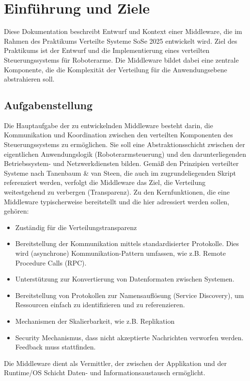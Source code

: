 \chapter{Einführung und Ziele}

Diese Dokumentation beschreibt Entwurf und Kontext einer Middleware, die im Rahmen des Praktikums \glqq Verteilte Systeme SoSe 2025\grqq{} entwickelt wird. Ziel des Praktikums ist der Entwurf und die Implementierung eines verteilten Steuerungssystems für Roboterarme. Die Middleware bildet dabei eine zentrale Komponente, die die Komplexität der Verteilung für die Anwendungsebene abstrahieren soll.


\section{Aufgabenstellung}
Die Hauptaufgabe der zu entwickelnden Middleware besteht darin, die Kommunikation und Koordination zwischen den verteilten Komponenten des Steuerungssystems zu ermöglichen. Sie soll eine Abstraktionsschicht zwischen der eigentlichen Anwendungslogik (Roboterarmsteuerung) und den darunterliegenden Betriebssystem- und Netzwerkdiensten bilden. Gemäß den Prinzipien verteilter Systeme nach Tanenbaum \& van Steen, die auch im zugrundeliegenden Skript referenziert werden, verfolgt die Middleware das Ziel, die Verteilung weitestgehend zu verbergen (Transparenz).
Zu den Kernfunktionen, die eine Middleware typischerweise bereitstellt und die hier adressiert werden sollen, gehören:

\begin{itemize}
	\item Zuständig für die Verteilungstransparenz	
	\item Bereitstellung der Kommunikation mittels standardisierter Protokolle. Dies wird (asynchrone) Kommunikation-Pattern umfassen, wie z.B. Remote Procedure Calls (RPC).
	\item Unterstützung zur Konvertierung von Datenformaten zwischen Systemen.
	\item Bereitstellung von Protokollen zur Namensauflösung (Service Discovery), um Ressourcen einfach zu identifizieren und zu referenzieren.
	\item Mechanismen der Skalierbarkeit, wie z.B. Replikation
	\item Security Mechanismus, dass nicht akzeptierte Nachrichten verworfen werden. Feedback muss stattfinden.
\end{itemize}

Die Middleware dient als Vermittler, der zwischen der Applikation und der Runtime/OS Schicht Daten- und Informationsaustausch ermöglicht.


